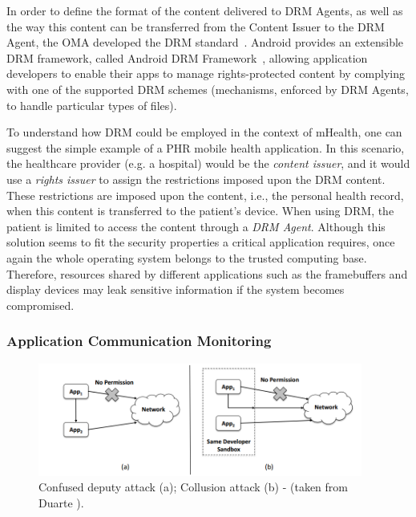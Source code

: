In order to define the format of the content delivered to DRM Agents, as well as the way this content can be transferred from the Content Issuer to the DRM Agent, the \ac{OMA} developed the DRM standard~\cite{drm}. Android provides an extensible DRM framework, called Android DRM Framework~\cite{android_drm}, allowing application developers to enable their apps to manage rights-protected content by complying with one of the supported DRM schemes (mechanisms, enforced by DRM Agents, to handle particular types of files).

To understand how \ac{DRM} could be employed in the context of mHealth, one can suggest the simple example of a \ac{PHR} mobile health application. In this scenario, the healthcare provider (e.g. a hospital) would be the \emph{content issuer}, and it would use a \emph{rights issuer} to assign the restrictions imposed upon the \ac{DRM} content. These restrictions are imposed upon the content, i.e., the personal health record, when this content is transferred to the patient's device. When using \ac{DRM}, the patient is limited to access the content through a \emph{\ac{DRM} Agent}. Although this solution seems to fit the security properties a critical application requires, once again the whole operating system belongs to the trusted computing base. Therefore, resources shared by different applications such as the framebuffers and display devices may leak sensitive information if the system becomes compromised.

\subsubsection{Application Communication Monitoring}

\begin{figure}[t!]
	\centering
	\includegraphics[width=0.95\textwidth]{img/communicationattacks.png}
	\caption{Confused deputy attack (a); Collusion attack (b) - (taken from Duarte \cite{nunoduarte}).}
	\label{fig:communicationattacks}
\end{figure}

